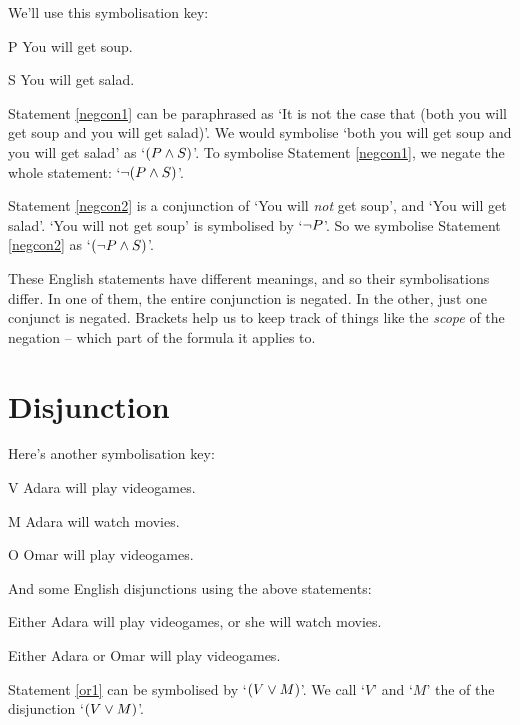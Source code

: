 \documentclass[PHIL101-Textbook.tex]{subfiles}
\begin{document}
\noindent  We'll use this symbolisation key:
\begin{ekey}
\item[P] You will get soup.
\item[S] You will get salad.
\end{ekey}                

\noindent Statement \ref{negcon1} can be paraphrased as `It is not the case that (both you will get soup and you will get salad)'.
We would symbolise `both you will get soup and you will get salad' as `$(P \land S)$'. To symbolise Statement \ref{negcon1}, we negate the whole statement: `$\neg (P \land S)$'. 

Statement \ref{negcon2} is a conjunction of `You will \emph{not} get soup', and `You will get salad'. `You will not get soup' is symbolised by `$\neg P$'. So we  symbolise Statement \ref{negcon2} as `$(\neg P \land S)$'. 

These English statements have different meanings, and so their symbolisations differ. In one of them, the entire conjunction is negated. In the other, just one conjunct is negated. Brackets help us to keep track of things like the \emph{scope} of the negation -- which part of the formula it applies to. 


\pagebreak
\section{Disjunction}

Here's another symbolisation key:
\begin{ekey}
\item[V] Adara will play videogames.
\item[M] Adara will watch movies.
\item[O] Omar will play videogames.
\end{ekey}

\noindent And some English disjunctions using the above statements:
\begin{earg}
\item[\ex{or1}]Either Adara will play videogames, or she will watch movies.
\item[\ex{or2}]Either Adara or Omar will play videogames. 
\end{earg}

  

Statement \ref{or1} can be symbolised by `$(V \vee M)$'. We call `$V$' and `$M$' the  of the disjunction `$(V \vee M)$'.
\end{document}
